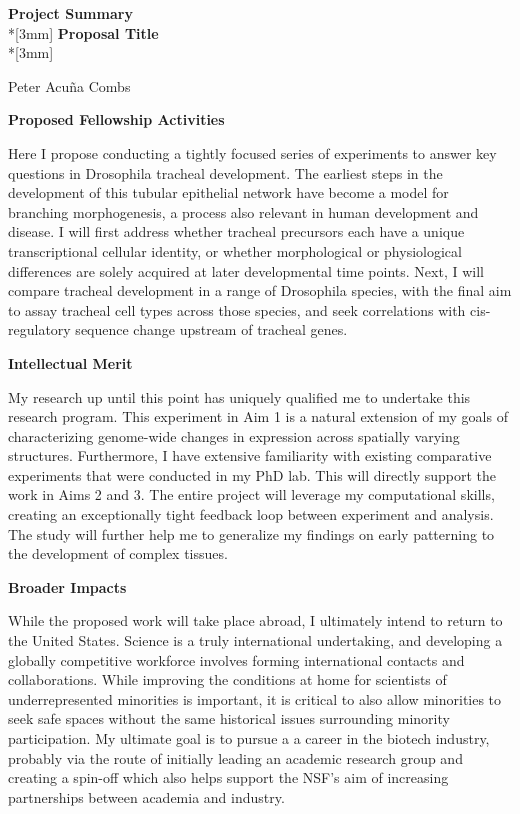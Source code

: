 \documentclass{proposal}
\begin{document}
\begin{center}
{\Large{\bf Project Summary}}\\*[3mm]
{\bf Proposal Title} \\*[3mm]

Peter Acu\~na Combs \\

\end{center}

\noindent
{\bf Proposed Fellowship Activities}

Here I propose conducting a tightly focused series of experiments to answer key questions in Drosophila tracheal development.
The earliest steps in the development of this tubular epithelial network have become a model for branching morphogenesis, a process also relevant in human development and disease.
I will first address whether tracheal precursors each have a unique transcriptional cellular identity, or whether morphological or physiological differences are solely acquired at later developmental time points.
Next, I will compare tracheal development in a range of Drosophila species, with the final aim to assay tracheal cell types across those species, and seek correlations with cis-regulatory sequence change upstream of tracheal genes.

\noindent
{\bf Intellectual Merit}

My research up until this point has uniquely qualified me to undertake this research program.
This experiment in Aim 1 is a natural extension of my goals of characterizing genome-wide changes in expression across spatially varying structures.
Furthermore,  I have extensive familiarity with existing comparative experiments that were conducted in my PhD lab.
This will directly support the work in Aims 2 and 3.  The entire project will leverage my computational skills, creating an exceptionally tight feedback loop between experiment and analysis.
The study will further help me to generalize my findings on early patterning to the development of complex tissues.

\noindent
{\bf Broader Impacts}

While the proposed work will take place abroad, I ultimately intend to return to the United States.
Science is a truly international undertaking, and developing a globally competitive workforce involves forming international contacts and collaborations.
While improving the conditions at home for scientists of underrepresented minorities is important, it is critical to also allow minorities to seek safe spaces without the same historical issues surrounding minority participation.
My ultimate goal is to pursue a a career in the biotech industry, probably via the route of initially leading an academic research group and creating a spin-off which also helps support the NSF's aim of increasing partnerships between academia and industry.
\end{document}
